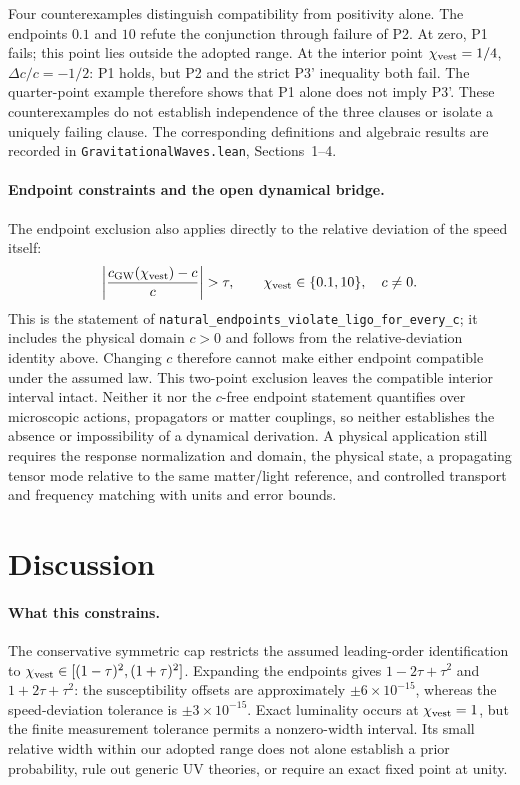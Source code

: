 \documentclass[aps,prl,reprint,nofootinbib,superscriptaddress]{revtex4-2}
\newcommand{\cGW}{c_{\rm GW}}
\newcommand{\chivest}{\chi_{\rm vest}}
\newcommand{\dccap}{\Delta c/c}
\begin{document}
Four counterexamples distinguish compatibility from positivity
alone. The endpoints $0.1$ and $10$ refute the conjunction through
failure of P2. At zero, P1 fails; this point lies outside the
adopted range. At the interior point $\chivest=1/4$,
$\dccap=-1/2$: P1 holds, but P2 and the strict P3' inequality
both fail. The quarter-point example therefore shows that P1
alone does not imply P3'. These counterexamples do not establish
independence of the three clauses or isolate a uniquely failing
clause. The corresponding definitions and algebraic results are
recorded in \texttt{GravitationalWaves.lean}, Sections~1--4.

\paragraph{Endpoint constraints and the open dynamical bridge.}
The endpoint exclusion also applies directly to the relative
deviation of the speed itself:
\[
  \left|\frac{\cGW(\chivest)-c}{c}\right|>\tau,
  \qquad
  \chivest\in\{0.1,10\},\quad c\ne0.
\]
This is the statement of
\texttt{natural\_endpoints\_violate\_ligo\_for\_every\_c};
it includes the physical domain $c>0$ and follows from the
relative-deviation identity above. Changing $c$ therefore
cannot make either endpoint compatible under the assumed law.
This two-point exclusion leaves the compatible interior interval
intact. Neither it nor the $c$-free endpoint statement quantifies
over microscopic actions, propagators or matter couplings, so
neither establishes the absence or impossibility of a dynamical
derivation. A physical application still requires the response
normalization and domain, the physical state, a propagating
tensor mode relative to the same matter/light reference, and
controlled transport and frequency matching with units and
error bounds.

\section{Discussion}
\label{sec:discussion}

\paragraph{What this constrains.} The conservative symmetric cap
restricts the assumed leading-order identification to
$\chivest\in[(1-\tau)^2,(1+\tau)^2]$.
Expanding the endpoints gives $1-2\tau+\tau^2$ and
$1+2\tau+\tau^2$: the susceptibility offsets are approximately
$\pm6\times10^{-15}$, whereas the speed-deviation tolerance is
$\pm3\times10^{-15}$. Exact luminality occurs at $\chivest=1$,
but the finite measurement tolerance permits a nonzero-width
interval. Its small relative width within our adopted range does not
alone establish a prior probability, rule out generic UV theories,
or require an exact fixed point at unity.
\end{document}
